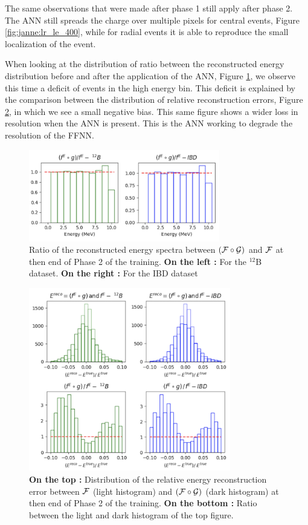 \documentclass[../main.tex]{subfiles}
\begin{document}
The same observations that were made after phase 1 still apply after phase 2. The ANN still spreads the charge over multiple pixels for central events, Figure \ref{fig:janne:lr_le_400}, while for radial events it is able to reproduce the small localization of the event.

When looking at the distribution of ratio between the reconstructed energy distribution before and after the application of the ANN, Figure \ref{fig:janne:f_circ_over_f_400}, we observe this time a deficit of events in the high energy bin. This deficit is explained by the comparison between the distribution of relative reconstruction errors, Figure \ref{fig:janne:rec_err_400}, in which we see a small negative bias. This same figure shows a wider loss in resolution when the ANN is present. This is the ANN working to degrade the resolution of the FFNN.

\begin{figure}[ht]
  \centering
  \includegraphics[height=4cm]{images/janne/f_circ_over_f_400.png}
  \caption{Ratio of the reconstructed energy spectra between $({\cal F} \circ {\cal G})$ and ${\cal F}$ at then end of Phase 2 of the training. \textbf{On the left :} For the $^{12}$B dataset. \textbf{On the right :} For the IBD dataset}
  \label{fig:janne:f_circ_over_f_400}
\end{figure}

\begin{figure}[ht]
  \centering
  \includegraphics[height=8cm]{images/janne/rec_err_400.png}
  \caption{\textbf{On the top :} Distribution of the relative energy reconstruction error between ${\cal F}$ (light histogram) and $({\cal F} \circ {\cal G})$ (dark histogram) at then end of Phase 2 of the training. \textbf{On the bottom :} Ratio between the light and dark histogram of the top figure.}
  \label{fig:janne:rec_err_400}
\end{figure}
\end{document}
